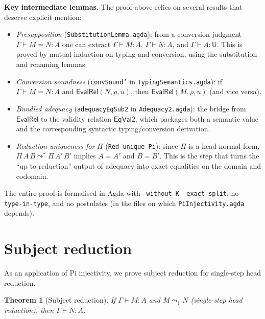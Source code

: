 \documentclass[11pt]{article}
\newcommand{\hastype}[3]{#1 \vdash #2 : #3}
\newcommand{\conveq}[4]{#1 \vdash #2 = #3 : #4}
\newcommand{\U}{\mathsf{U}}
\newtheorem{theorem}{Theorem}
\begin{document}
\medskip\noindent\textbf{Key intermediate lemmas.}
The proof above relies on several results that deserve explicit mention:
\begin{itemize}
  \item \emph{Presupposition}
    (\texttt{SubstitutionLemma.agda}): from a conversion judgment
    $\conveq{\Gamma}{M}{N}{A}$ one can extract
    $\hastype{\Gamma}{M}{A}$, $\hastype{\Gamma}{N}{A}$, and
    $\hastype{\Gamma}{A}{\U}$.  This is proved by mutual induction
    on typing and conversion, using the substitution and renaming
    lemmas.
  \item \emph{Conversion soundness} (\texttt{convSound'} in
    \texttt{TypingSemantics.agda}): if
    $\conveq{\Gamma}{M}{N}{A}$ and $\mathsf{EvalRel}(N,\rho,u)$,
    then $\mathsf{EvalRel}(M,\rho,u)$ (and vice versa).
  \item \emph{Bundled adequacy} (\texttt{adequacyEqSub2} in
    \texttt{Adequacy2.agda}): the bridge from $\mathsf{EvalRel}$
    to the validity relation $\mathsf{EqVal2}$, which packages both
    a semantic value and the corresponding syntactic typing/conversion
    derivation.
  \item \emph{Reduction uniqueness for} $\Pi$
    (\texttt{Red-unique-Pi}): since $\Pi$ is a head normal form,
    $\Pi\,A\,B \leadsto^* \Pi\,A'\,B'$ implies $A = A'$ and $B = B'$.
    This is the step that turns the ``up to reduction'' output of
    adequacy into exact equalities on the domain and codomain.
\end{itemize}

\medskip\noindent
The entire proof is formalised in Agda with \texttt{--without-K
--exact-split}, no \texttt{--type-in-type}, and no postulates
(in the files on which \texttt{PiInjectivity.agda} depends).

\section{Subject reduction}

As an application of Pi injectivity, we prove subject reduction
for single-step head reduction.

\begin{theorem}[Subject reduction]
  If\/ $\hastype{\Gamma}{M}{A}$ and $M \leadsto_1 N$ (single-step
  head reduction), then $\hastype{\Gamma}{N}{A}$.
\end{theorem}
\end{document}
